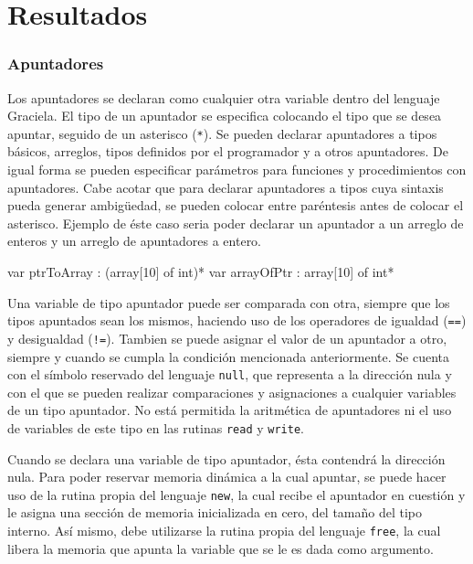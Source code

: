 \chapter{Resultados}
\label{capitulo4}

\subsection{Apuntadores}

Los apuntadores se declaran como cualquier otra variable dentro del lenguaje
Graciela. El tipo de un apuntador se especifica colocando el tipo que se desea
apuntar, seguido de un asterisco (\texttt{*}). Se pueden declarar apuntadores
a tipos básicos, arreglos, tipos definidos por el programador y a otros
apuntadores. De igual forma se pueden especificar parámetros para funciones y
procedimientos con apuntadores. Cabe acotar que para declarar apuntadores a
tipos cuya sintaxis pueda generar ambigüedad, se pueden colocar entre paréntesis
antes de colocar el asterisco. Ejemplo de éste caso seria poder declarar un apuntador a
un arreglo de enteros y un arreglo de apuntadores a entero.

\begin{gracielacode}
var ptrToArray : (array[10] of int)*
var arrayOfPtr :  array[10] of int*
\end{gracielacode}

Una variable de tipo apuntador puede ser comparada con otra, siempre que los
tipos apuntados sean los mismos, haciendo uso de los operadores de igualdad
(\texttt{==}) y desigualdad (\texttt{!=}). Tambien se puede asignar el valor
de un apuntador a otro, siempre y cuando se cumpla la condición mencionada
anteriormente. Se cuenta con el símbolo reservado del lenguaje
\texttt{null}, que representa a la dirección nula y con el que se pueden
realizar comparaciones y asignaciones a cualquier variables de un
tipo apuntador. No está permitida la aritmética de apuntadores ni el uso de
variables de este tipo en las rutinas \texttt{read} y \texttt{write}.

Cuando se declara una variable de tipo apuntador, ésta contendrá la dirección
nula. Para poder reservar memoria dinámica a la cual apuntar, se puede hacer
uso de la rutina propia del lenguaje \texttt{new}, la cual recibe el apuntador
en cuestión y le asigna una sección de memoria inicializada en cero, del
tamaño del tipo interno. Así mismo, debe utilizarse la rutina propia del
lenguaje \texttt{free}, la cual libera la memoria que apunta la variable que
se le es dada como argumento.

